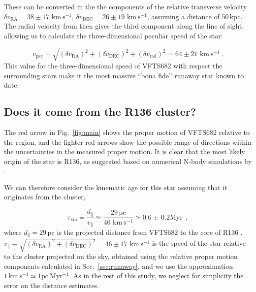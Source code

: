 \documentclass[apjl,twocolumn]{emulateapj}
\newcommand{\kms}{{\,\mathrm{km\ s^{-1}}}}
\DeclareRobustCommand{\Figref}[1]{Fig.~\ref{#1}}
\DeclareRobustCommand{\Secref}[1]{Sec.~\ref{#1}}
\begin{document}
These can be converted in the
the components of the relative transverse velocity $\delta v_\mathrm{RA}=38\pm17\,\kms$,
$\delta v_\mathrm{DEC}=26\pm19\,\kms$, assuming a distance of
50\,kpc. %
The radial velocity from
\cite{bestenlehner:11} then gives the third component along
the line of sight, allowing us to calculate the three-dimensional
peculiar speed of the star:

\begin{equation}
  \label{eq:speed_around}
  v_\mathrm{pec} = \sqrt{\left(\delta v_\mathrm{RA}\right)^2
    +\left(\delta v_\mathrm{DEC}\right)^2+\left(\delta
      v_\mathrm{rad}\right)^2} = 64 \pm 21 
  \, \kms \ .
\end{equation}
This value for the three-dimensional speed of VFTS682 with respect the
surrounding stars make it the most massive ``bona fide'' runaway star
known to date.

\subsection{Does it come from the R136 cluster?}
\label{sec:r136_origin}

The red arrow in \Figref{fig:main} shows the proper motion of VFTS682
relative to the region, and the lighter red arrows show the possible
range of directions within the uncertainties in the measured proper
motion. It is clear that the most likely origin of the star is R136,
as suggested based on numerical N-body simulations by \cite{fujii:11, banerjee:12}.


We can therefore consider the kinematic age for this star assuming
that it originates from the cluster,

\begin{equation}
  \label{eq:kin_age}
  \tau_\mathrm{kin} = \frac{d_\parallel}{v_\parallel} \simeq
  \frac{29\,\mathrm{pc}}{46\,\kms} \simeq 0.6\pm\,0.2 \mathrm{Myr} \ \ ,
\end{equation}
where $d_\parallel =29$\,pc is the projected distance from VFTS682 to
the core of R136 \citep[][]{bestenlehner:11}, $v_\parallel \equiv \sqrt{\left(\delta v_\mathrm{RA}\right)^2
    +\left(\delta v_\mathrm{DEC}\right)^2} =46\pm
17\,\kms$ is the speed of the star relative to the cluster projected on the sky, obtained
using the relative proper motion components calculated in
\Secref{sec:runaway}, and we use the approximation $1 \kms \simeq 1
\mathrm{pc \ Myr^{-1}}$. As in the rest of this study, we neglect for
simplicity the error on the distance estimates.
\end{document}
